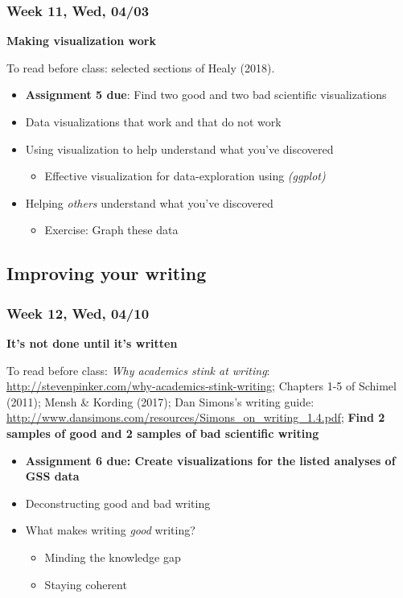 \documentclass[11pt,man]{article}
\providecommand{\tightlist}{%
  \setlength{\itemsep}{0pt}\setlength{\parskip}{0pt}}
\begin{document}
\subsubsection{Week 11, Wed, 04/03}\label{week-11-wed-0403}

\textbf{Making visualization work}

To read before class: selected sections of Healy (2018).

\begin{itemize}
\tightlist
\item
  \textbf{Assignment 5 due}: Find two good and two bad scientific
  visualizations
\item
  Data visualizations that work and that do not work
\item
  Using visualization to help understand what you've discovered

  \begin{itemize}
  \tightlist
  \item
    Effective visualization for data-exploration using \emph{(ggplot)}
  \end{itemize}
\item
  Helping \emph{others} understand what you've discovered

  \begin{itemize}
  \tightlist
  \item
    Exercise: Graph these data
  \end{itemize}
\end{itemize}

\subsection{Improving your writing}\label{improving-your-writing}

\subsubsection{Week 12, Wed, 04/10}\label{week-12-wed-0410}

\textbf{It's not done until it's written}

To read before class: \emph{Why academics stink at writing}:
\url{http://stevenpinker.com/why-academics-stink-writing}; Chapters 1-5
of Schimel (2011); Mensh \& Kording (2017); Dan Simons's writing guide:
\url{http://www.dansimons.com/resources/Simons_on_writing_1.4.pdf};
\textbf{Find 2 samples of good and 2 samples of bad scientific writing}

\begin{itemize}
\tightlist
\item
  \textbf{Assignment 6 due: Create visualizations for the listed
  analyses of GSS data}
\item
  Deconstructing good and bad writing
\item
  What makes writing \emph{good} writing?

  \begin{itemize}
  \tightlist
  \item
    Minding the knowledge gap
  \item
    Staying coherent
  \end{itemize}
\end{itemize}
\end{document}
